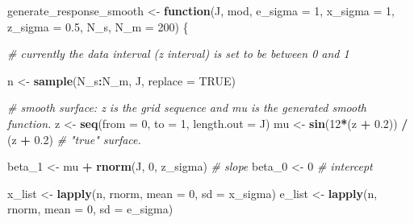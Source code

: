 \documentclass[
]{article}
\newenvironment{Shaded}{\begin{snugshade}}{\end{snugshade}}
\newcommand{\CommentTok}[1]{\textcolor[rgb]{0.56,0.35,0.01}{\textit{#1}}}
\newcommand{\ControlFlowTok}[1]{\textcolor[rgb]{0.13,0.29,0.53}{\textbf{#1}}}
\newcommand{\DataTypeTok}[1]{\textcolor[rgb]{0.13,0.29,0.53}{#1}}
\newcommand{\DecValTok}[1]{\textcolor[rgb]{0.00,0.00,0.81}{#1}}
\newcommand{\FloatTok}[1]{\textcolor[rgb]{0.00,0.00,0.81}{#1}}
\newcommand{\KeywordTok}[1]{\textcolor[rgb]{0.13,0.29,0.53}{\textbf{#1}}}
\newcommand{\NormalTok}[1]{#1}
\newcommand{\OperatorTok}[1]{\textcolor[rgb]{0.81,0.36,0.00}{\textbf{#1}}}
\newcommand{\OtherTok}[1]{\textcolor[rgb]{0.56,0.35,0.01}{#1}}
\newcommand{\StringTok}[1]{\textcolor[rgb]{0.31,0.60,0.02}{#1}}
\begin{document}
\begin{Shaded}
\begin{Highlighting}[]
\NormalTok{generate_response_smooth <-}\StringTok{ }\ControlFlowTok{function}\NormalTok{(J, mod, }\DataTypeTok{e_sigma =} \DecValTok{1}\NormalTok{, }\DataTypeTok{x_sigma =} \DecValTok{1}\NormalTok{, }\DataTypeTok{z_sigma =} \FloatTok{0.5}\NormalTok{, N_s, }\DataTypeTok{N_m =} \DecValTok{200}\NormalTok{) \{}

  \CommentTok{# currently the data interval (z interval) is set to be between 0 and 1}

\NormalTok{  n <-}\StringTok{ }\KeywordTok{sample}\NormalTok{(N_s}\OperatorTok{:}\NormalTok{N_m, J, }\DataTypeTok{replace =} \OtherTok{TRUE}\NormalTok{)}

  \CommentTok{# smooth surface: z is the grid sequence and mu is the generated smooth function.}
\NormalTok{  z <-}\StringTok{ }\KeywordTok{seq}\NormalTok{(}\DataTypeTok{from =} \DecValTok{0}\NormalTok{, }\DataTypeTok{to =} \DecValTok{1}\NormalTok{, }\DataTypeTok{length.out =}\NormalTok{ J)}
\NormalTok{  mu <-}\StringTok{ }\KeywordTok{sin}\NormalTok{(}\DecValTok{12}\OperatorTok{*}\NormalTok{(z }\OperatorTok{+}\StringTok{ }\FloatTok{0.2}\NormalTok{)) }\OperatorTok{/}\StringTok{ }\NormalTok{(z }\OperatorTok{+}\StringTok{ }\FloatTok{0.2}\NormalTok{)  }\CommentTok{# "true" surface.}

\NormalTok{  beta_}\DecValTok{1}\NormalTok{ <-}\StringTok{ }\NormalTok{mu }\OperatorTok{+}\StringTok{ }\KeywordTok{rnorm}\NormalTok{(J, }\DecValTok{0}\NormalTok{, z_sigma)  }\CommentTok{# slope}
\NormalTok{  beta_}\DecValTok{0}\NormalTok{ <-}\StringTok{ }\DecValTok{0}  \CommentTok{# intercept}

\NormalTok{  x_list <-}\StringTok{ }\KeywordTok{lapply}\NormalTok{(n, rnorm, }\DataTypeTok{mean =} \DecValTok{0}\NormalTok{, }\DataTypeTok{sd =}\NormalTok{ x_sigma)}
\NormalTok{  e_list <-}\StringTok{ }\KeywordTok{lapply}\NormalTok{(n, rnorm, }\DataTypeTok{mean =} \DecValTok{0}\NormalTok{, }\DataTypeTok{sd =}\NormalTok{ e_sigma)}


\end{Highlighting}
\end{Shaded}
\end{document}
